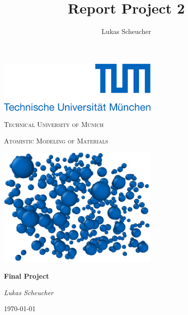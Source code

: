 \documentclass[10pt,a4paper]{report}
\title{Report Project 2}
\author{Lukas Scheucher}
\begin{document}
\begin{titlepage}
	\centering
	\includegraphics[width=0.6\textwidth]{tum_logo.png}\par\vspace{1cm}
	{\scshape\LARGE Technical University of Munich \par}
	\vspace{1cm}
	{\scshape\Large Atomistic Modeling of Materials\par}
	\vspace{1.5cm}
	\includegraphics[width=0.6\textwidth]{titlepicture2.png}\par\vspace{1cm}
	{\huge\bfseries Final Project\par}
	\vspace{2cm}
	{\Large\itshape Lukas Scheucher\par}
	\vfill

	\vfill

	{\large \today\par}
\end{titlepage}






\tableofcontents
\listoffigures
\end{document}
